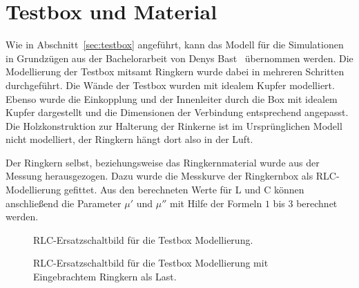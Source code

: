 \section{Testbox und Material}
Wie in Abschnitt~\ref{sec:testbox} angef\"uhrt, kann das Modell f\"ur die Simulationen in Grundz\"ugen aus der Bachelorarbeit von Denys Bast~\cite{bast2017ba} \"ubernommen werden. Die Modellierung der Testbox mitsamt Ringkern wurde dabei in mehreren Schritten durchgef\"uhrt. Die W\"ande der Testbox wurden mit idealem Kupfer modelliert. Ebenso wurde die Einkopplung und der Innenleiter durch die Box mit idealem Kupfer dargestellt und die Dimensionen der Verbindung entsprechend angepasst. Die Holzkonstruktion zur Halterung der Rinkerne ist im Urspr\"unglichen Modell nicht modelliert, der Ringkern h\"angt dort also in der Luft.
\par
Der Ringkern selbst, beziehungsweise das Ringkernmaterial wurde aus der Messung herausgezogen. Dazu wurde die Messkurve der Ringkernbox als RLC-Modellierung gefittet. Aus den berechneten Werte f\"ur L und C k\"onnen anschlie\ss{}end die Parameter $\mu'$ und $\mu''$ mit Hilfe der Formeln $1$ bis $3$ berechnet werden.
\par
\begin{figure}[htb]
\centering
{}
\caption{RLC-Ersatzschaltbild f\"ur die Testbox Modellierung.}
\end{figure}

\par

\begin{figure}[htb]
\centering
{}
\caption{RLC-Ersatzschaltbild f\"ur die Testbox Modellierung mit Eingebrachtem Ringkern als Last.}
\end{figure}

